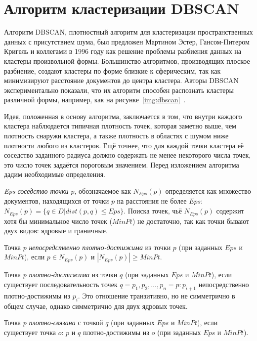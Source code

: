 \section{Алгоритм кластеризации DBSCAN}

Алгоритм DBSCAN, плотностный алгоритм для кластеризации пространственных данных с присутствием шума, был предложен Мартином Эстер, Гансом-Питером Кригель и коллегами в 1996 году как решение проблемы разбиения данных на кластеры произвольной формы.
Большинство алгоритмов, производящих плоское разбиение, создают кластеры по форме близкие к сферическим, так как минимизируют расстояние документов до центра кластера.
Авторы DBSCAN экспериментально показали, что их алгоритм способен распознать кластеры различной формы, например, как на \mbox{рисунке \ref{img:dbscan} \cite[197]{book}}.

Идея, положенная в основу алгоритма, заключается в том, что внутри каждого кластера наблюдается типичная плотность точек, которая заметно выше, чем плотность снаружи кластера, а также плотность в областях с шумом ниже плотности любого из кластеров.
Ещё точнее, что для каждой точки кластера её соседство заданного радиуса должно содержать не менее некоторого числа точек, это число точек задаётся пороговым значением. Перед изложением алгоритма дадим необходимые определения.

\textit{Eps-соседство точки $p$}, обозначаемое как $N_{Eps}(p)$ определяется как множество документов, находящихся от точки $p$ на расстояния не более $Eps$:
$N_{Eps}(p) = \{q \in D | dist(p, q) \leq Eps\}$.
Поиска точек, чьё $N_{Eps}(p)$ содержит хотя бы минимальное число точек ($MinPt$) не достаточно, так как точки бывают двух видов: ядровые и граничные.

Точка $p$ \textit{непосредственно плотно-достижима} из точки $p$ (при заданных $Eps$ и $MinPt$), если
$p \in N_{Eps}(p)$ и $|N_{Eps}(p)| \geq MinPt$.

Точка $p$ \textit{плотно-достижима} из точки $q$ (при заданных $Eps$ и $MinPt$), если существует последовательность точек
$q = p_1, p_2, \ldots, p_n = p: p_{i+1}$
непосредственно плотно-достижимы из $p_i$.
Это отношение транзитивно, но не симметрично в общем случае, однако симметрично для двух ядровых точек.

Точка $p$ \textit{плотно-связана} с точкой $q$ (при заданных $Eps$ и $MinPt$), если существует точка $o$: $p$ и $q$ плотно-достижимы из $o$ (при заданных $Eps$ и $MinPt$).

